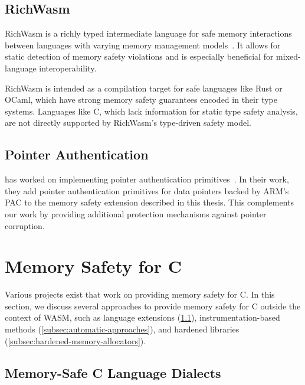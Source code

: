 \subsection{RichWasm}
\label{subsec:richwasm}

RichWasm is a richly typed intermediate language for safe memory interactions between languages with varying memory management models~\cite{paraskevopoulou2024richwasm}.
It allows for static detection of memory safety violations and is especially beneficial for mixed-language interoperability.

RichWasm is intended as a compilation target for safe languages like Rust or OCaml, which have strong memory safety guarantees encoded in their type systems.
Languages like C, which lack information for static type safety analysis, are not directly supported by RichWasm's type-driven safety model.

\subsection{Pointer Authentication}
\label{subsec:related-pointer-authentication}

\citeauthor*{rehde2023wasm} has worked on implementing pointer authentication primitives~\cite{rehde2023wasm}.
In their work, they add pointer authentication primitives for data pointers backed by ARM's \ac{PAC} to the memory safety extension described in this thesis.
This complements our work by providing additional protection mechanisms against pointer corruption.

\section{Memory Safety for C}
\label{sec:related-memory-safety}

Various projects exist that work on providing memory safety for C.
In this section, we discuss several approaches to provide memory safety for C outside the context of \ac{WASM}, such as language extensions (\cref{subsec:extensions-to-the-c-language}), instrumentation-based methods (\cref{subsec:automatic-approaches}), and hardened libraries (\cref{subsec:hardened-memory-allocators}).

\subsection{Memory-Safe C Language Dialects}
\label{subsec:extensions-to-the-c-language}

